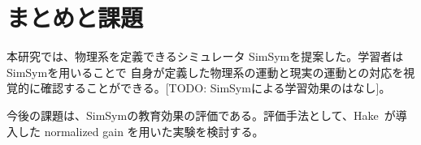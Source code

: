 \documentclass[11pt, a4paper, oneside, twocolumn, dvipdfmx]{jsarticle}
\newcommand{\simname}{SimSym}
\begin{document}

\section{まとめと課題}
本研究では、物理系を定義できるシミュレータ \simname を提案した。学習者は\simname を用いることで
自身が定義した物理系の運動と現実の運動との対応を視覚的に確認することができる。[TODO: SimSymによる学習効果のはなし]。

今後の課題は、\simname の教育効果の評価である。評価手法として、Hake~\cite{hake_1998}が導入した normalized gain を用いた実験を検討する。


\tiny{}
\end{document}
